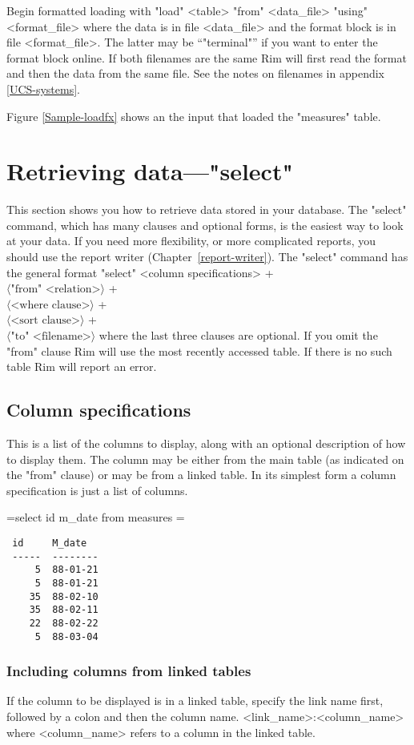 \documentclass[11pt,a4paper]{report}
\def\opt#1{$\langle \mbox{#1} \rangle$}
\def\Rimdemo#1{\par\bigskip\toks0={#1}
  \setbox\Rimdemobox=\vbox\bgroup\hsize=24pc\scriptsize}
\def\enddemo{\egroup\noindent\fbox{\parbox{355pt}{%
  \vspace{1ex}
  {\tt\begin{tabular}{l}\the\toks0\end{tabular}\par}
  \vspace{1ex}
  \makebox[355pt]{\hfill\fbox{\fbox{\box\Rimdemobox}}\hskip1ex}\vspace{1ex}}}}
\def\I{\index}
\begin{document}
Begin formatted loading with
"load" <table> "from" <data\_file> "using" <format\_file>
where the data is in file <data\_file> and the format block
is in file <format\_file>. The latter may be ``"terminal"''
if you want to enter the format block online.
If both filenames are the same Rim will first read the
format and then the data from the same file.
See the notes on filenames in appendix \ref{UCS-systems}.
 
Figure \ref{Sample-loadfx} shows an the input that loaded
the "measures" table.
\I{load@"load"|)}
 
 
\section{Retrieving data---"select"}
%
\I{select@"select"|}
This section shows you how to retrieve data stored in
your database.
The "select" command, which has many clauses and optional forms,
is the easiest way to look at your data.
If you need more flexibility, or more complicated reports,
you should use the report writer (Chapter~\ref{report-writer}).
The "select" command has the general format
"select" <column specifications> + \\
  \qquad \opt{"from" <relation>} + \\
  \qquad \opt{<where clause>} + \\
  \qquad \opt{<sort clause>} + \\
  \qquad \opt{"to" <filename>}
where the last three clauses are optional.
If you omit the "from" clause Rim will use the most recently
accessed table.  If there is no such table
Rim will report an error.
 
\subsection{Column specifications}
%
This is a list of the columns to display, along with an optional
description of how to display them.  The column may be either
from the main table (as indicated on the "from" clause) or may
be from a linked\I{link} table.
In its simplest form a column specification is just a list of columns.
 
\Rimdemo{select id m_date from measures}
\begin{verbatim}
 id     M_date
 -----  --------
     5  88-01-21
     5  88-01-21
    35  88-02-10
    35  88-02-11
    22  88-02-22
     5  88-03-04
\end{verbatim}
 
\subsubsection{Including columns from linked tables}
%
\I{link}
If the column to be displayed is in a linked table, specify
the link name first, followed by a colon and then the column name.
<link\_name>:<column\_name>
where <column\_name> refers to a column in the linked table.
 
\end{document}
